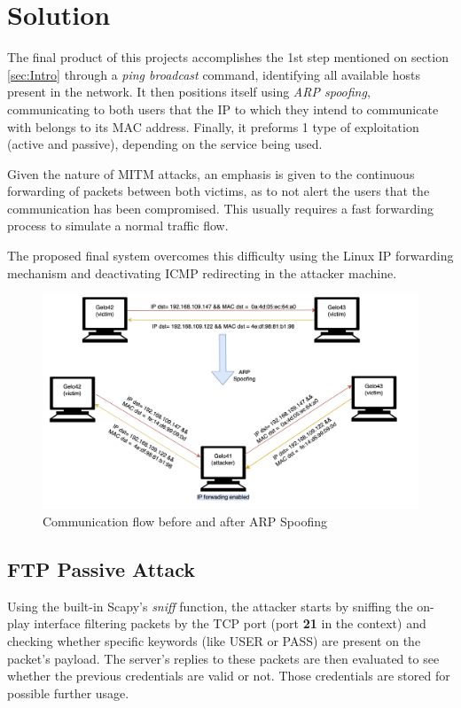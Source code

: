 \section{Solution}
\label{sec:Solution}
The final product of this projects accomplishes the 1st step mentioned on 
section \ref{sec:Intro} through a \textit{ping broadcast} command, 
identifying all available hosts present in the network.
It then positions itself using \textit{ARP spoofing}, communicating to both 
users that the IP to which they intend to communicate with belongs to its MAC 
address. 
Finally, it preforms 1 type of exploitation (active and passive), depending on
the service being used.

Given the nature of MITM attacks, an emphasis is given to the continuous 
forwarding of packets between both victims, as to not alert the users that the 
communication has been compromised.
This usually requires a fast forwarding process to simulate a normal traffic 
flow. 

The proposed final system overcomes this difficulty using the Linux 
IP forwarding mechanism and deactivating ICMP redirecting in the attacker machine.

\begin{figure}[h!]
    \centering
    \includegraphics[width=1\linewidth,keepaspectratio]{ARPSpoffing.png}
    \caption{Communication flow before and after ARP Spoofing}
    \label{fig:ArpSpoofing}
\end{figure}
\FloatBarrier

\subsection{FTP Passive Attack}

Using the built-in Scapy's \textit{sniff} function, the attacker starts by sniffing the on-play interface filtering packets by the TCP port (port \textbf{21} in the context) and checking whether specific keywords (like USER or PASS) are present on the packet's payload. The server's replies to these packets are then evaluated to see whether the previous credentials are valid or not. Those credentials are stored for possible further usage. 


